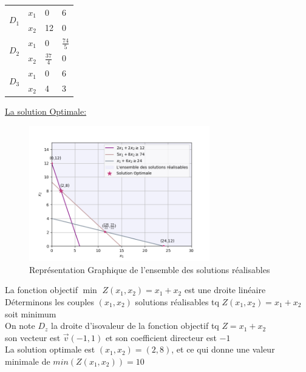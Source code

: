 \documentclass[]{book}
\begin{document}
\begin{center}
    \begin{tabular}{ | m{0.5cm} | m{0.5cm}| m{1cm} | m{1cm} | } 
      \hline
        \multirow{2}{4em}{$D_1$} & $x_1$  & 0 & 6 \\
        \cline{2-4} & $x_2$  & 12 & 0 \\
        \hline
        
        \multirow{2}{4em}{$D_2$} & $x_1$ & 0 & $\frac{74}{5}$ \\
        \cline{2-4} & $x_2$ & $\frac{37}{4}$ & 0 \\
        \hline
        
        \multirow{2}{4em}{$D_3$} & $x_1$ & 0 & 6 \\
        \cline{2-4} & $x_2$ & 4 & 3 \\
        \hline
    \end{tabular}
\end{center}


\underline{La solution Optimale:}

\begin{figure}[H]
    \centering
    \includegraphics[width=0.7\textwidth]{Figures/figure_02.png}
    \caption{Représentation Graphique de l'ensemble des solutions réalisables}
    \label{fig:placeholder}
\end{figure}

La fonction objectif $\min$ $Z(x_1,x_2) = x_1 + x_2$ est une droite linéaire\\
Déterminons les couples $(x_1, x_2)$ solutions réalisables tq $Z(x_1,x_2) = x_1 + x_2$ soit minimum\\
On note $D_z$ la droite d'isovaleur de la fonction objectif tq $Z = x_1 + x_2$\\
son vecteur est $\Vec{v}(-1,1)$ et son coefficient directeur est $-1$\\
La solution optimale est $(x_1,x_2)=(2,8)$, et ce qui donne une valeur minimale de $min(Z(x_1,x_2)) = 10$
\end{document}
